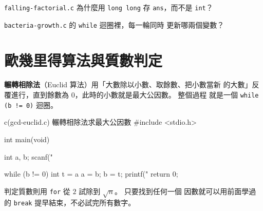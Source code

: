 
\begin{drills}[label=drills:loop-product]
\item \texttt{falling-factorial.c} 為什麼用 \texttt{long long} 存
\texttt{ans}，而不是 \texttt{int}？
\item \texttt{bacteria-growth.c} 的 \texttt{while} 迴圈裡，每一輪同時
更新哪兩個變數？
\end{drills}

\section{歐幾里得算法與質數判定}
\label{sec:loop-gcd-prime}

\textbf{輾轉相除法}（Euclid 算法）用「大數除以小數、取餘數、把小數當新
的大數」反覆進行，直到餘數為 $0$，此時的小數就是最大公因數。 整個過程
就是一個 \texttt{while (b != 0)} 迴圈。

\begin{example}{c}{(gcd-euclid.c) 輾轉相除法求最大公因數}
#include <stdio.h>

int main(void) {
    int a, b;
    scanf("%

    while (b != 0) {
        int t = a %
        a = b;
        b = t;
    }
    printf("%
    return 0;
}
\end{example}


判定質數則用 \texttt{for} 從 $2$ 試除到 $\sqrt{n}$。 只要找到任何一個
因數就可以用前面學過的 \texttt{break} 提早結束，不必試完所有數字。



